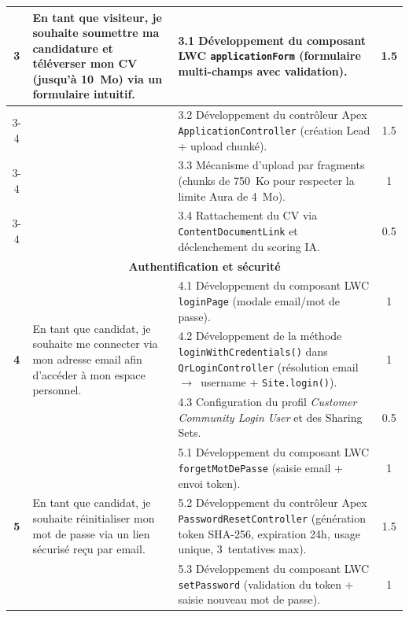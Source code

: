 \begin{longtable}{|c|p{5.5cm}|p{6cm}|c|}
\hline

\multirow{4}{*}{\textbf{3}} & \multirow{4}{5.5cm}{En tant que visiteur, je souhaite soumettre ma candidature et téléverser mon CV (jusqu'à 10~Mo) via un formulaire intuitif.} & 3.1 Développement du composant LWC \texttt{applicationForm} (formulaire multi-champs avec validation). & 1.5 \\
\cline{3-4}
& & 3.2 Développement du contrôleur Apex \texttt{ApplicationController} (création Lead + upload chunké). & 1.5 \\
\cline{3-4}
& & 3.3 Mécanisme d'upload par fragments (chunks de 750~Ko pour respecter la limite Aura de 4~Mo). & 1 \\
\cline{3-4}
& & 3.4 Rattachement du CV via \texttt{ContentDocumentLink} et déclenchement du scoring IA. & 0.5 \\

\hline

\multicolumn{4}{|c|}{\cellcolor{green!8}\textbf{Authentification et sécurité}} \\
\hline

\multirow{3}{*}{\textbf{4}} & \multirow{3}{5.5cm}{En tant que candidat, je souhaite me connecter via mon adresse email afin d'accéder à mon espace personnel.} & 4.1 Développement du composant LWC \texttt{loginPage} (modale email/mot de passe). & 1 \\
\cline{3-4}
& & 4.2 Développement de la méthode \texttt{loginWithCredentials()} dans \texttt{QrLoginController} (résolution email~$\rightarrow$~username + \texttt{Site.login()}). & 1 \\
\cline{3-4}
& & 4.3 Configuration du profil \textit{Customer Community Login User} et des Sharing Sets. & 0.5 \\

\hline

\multirow{3}{*}{\textbf{5}} & \multirow{3}{5.5cm}{En tant que candidat, je souhaite réinitialiser mon mot de passe via un lien sécurisé reçu par email.} & 5.1 Développement du composant LWC \texttt{forgetMotDePasse} (saisie email + envoi token). & 1 \\
\cline{3-4}
& & 5.2 Développement du contrôleur Apex \texttt{PasswordResetController} (génération token SHA-256, expiration 24h, usage unique, 3~tentatives max). & 1.5 \\
\cline{3-4}
& & 5.3 Développement du composant LWC \texttt{setPassword} (validation du token + saisie nouveau mot de passe). & 1 \\


\end{longtable}
